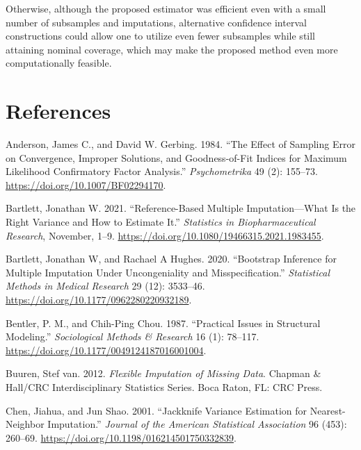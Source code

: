 \documentclass[
  letterpaper,
  DIV=11,
  numbers=noendperiod]{scrreprt}
\newlength{\cslhangindent}
\newlength{\cslentryspacingunit} %
\newenvironment{CSLReferences}[2] %
 {%
  \setlength{\parindent}{0pt}
  \ifodd #1
  \let\oldpar\par
  \def\par{\hangindent=\cslhangindent\oldpar}
  \fi
  \setlength{\parskip}{#2\cslentryspacingunit}
 }%
 {}
\begin{document}
Otherwise, although the proposed estimator was efficient even with a
small number of subsamples and imputations, alternative confidence
interval constructions could allow one to utilize even fewer subsamples
while still attaining nominal coverage, which may make the proposed
method even more computationally feasible.


\hypertarget{references}{%
\chapter*{References}\label{references}}

\hypertarget{refs}{}
\begin{CSLReferences}{1}{0}
\leavevmode{}%
Anderson, James C., and David W. Gerbing. 1984. {``The Effect of
Sampling Error on Convergence, Improper Solutions, and Goodness-of-Fit
Indices for Maximum Likelihood Confirmatory Factor Analysis.''}
\emph{Psychometrika} 49 (2): 155--73.
\url{https://doi.org/10.1007/BF02294170}.

\leavevmode{}%
Bartlett, Jonathan W. 2021. {``Reference-Based Multiple
Imputation---What Is the Right Variance and How to Estimate It.''}
\emph{Statistics in Biopharmaceutical Research}, November, 1--9.
\url{https://doi.org/10.1080/19466315.2021.1983455}.

\leavevmode{}%
Bartlett, Jonathan W, and Rachael A Hughes. 2020. {``Bootstrap Inference
for Multiple Imputation Under Uncongeniality and Misspecification.''}
\emph{Statistical Methods in Medical Research} 29 (12): 3533--46.
\url{https://doi.org/10.1177/0962280220932189}.

\leavevmode{}%
Bentler, P. M., and Chih-Ping Chou. 1987. {``Practical Issues in
Structural Modeling.''} \emph{Sociological Methods \& Research} 16 (1):
78--117. \url{https://doi.org/10.1177/0049124187016001004}.

\leavevmode{}%
Buuren, Stef van. 2012. \emph{Flexible Imputation of Missing Data}.
Chapman \& Hall/{CRC} Interdisciplinary Statistics Series. Boca Raton,
{FL}: {CRC} Press.

\leavevmode{}%
Chen, Jiahua, and Jun Shao. 2001. {``Jackknife Variance Estimation for
Nearest-Neighbor Imputation.''} \emph{Journal of the American
Statistical Association} 96 (453): 260--69.
\url{https://doi.org/10.1198/016214501750332839}.


\end{CSLReferences}
\end{document}
